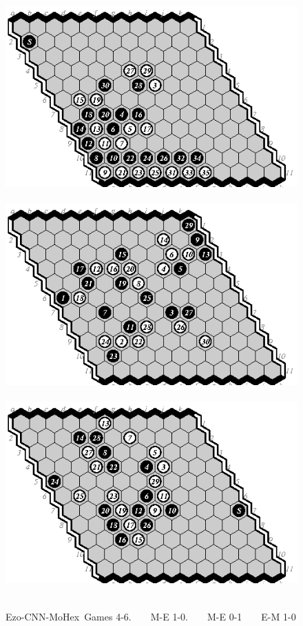 \documentclass{icga}
\def\Ec{\mbox{\sc Ezo-CNN}}
\def\Mx{\mbox{\sc MoHex}}
\begin{document}
\begin{figure}[hbp]
\includegraphics[scale=1]{pix/11.me4.eps}\hspace*{-1.2cm}\
\includegraphics[scale=1]{pix/11.me5.eps}\hspace*{-1.2cm}\
\includegraphics[scale=1]{pix/11.em6.eps}\hspace*{-1.2cm}\
\caption{\Ec-\Mx\ Games 4-6. ~ ~ M-E 1-0. ~ ~ M-E 0-1 ~ ~ E-M 1-0}
\end{figure}
\end{document}
